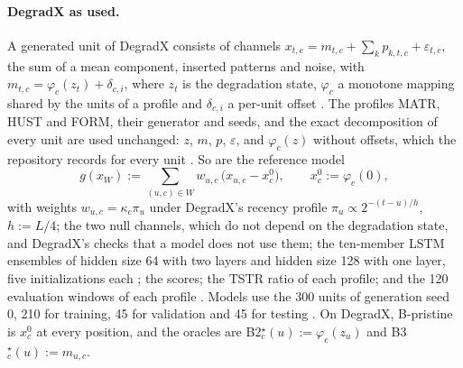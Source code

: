 \documentclass{article}
\begin{document}
\paragraph{DegradX as used.} A generated unit of DegradX consists of channels $x_{t,c} = m_{t,c}+\sum_k p_{k,t,c}+\varepsilon_{t,c}$, the sum of a mean component, inserted patterns and noise, with $m_{t,c}=\varphi_c(z_t)+\delta_{c,i}$, where $z_t$ is the degradation state, $\varphi_c$ a monotone mapping shared by the units of a profile and $\delta_{c,i}$ a per-unit offset \citep{degradx2026}. The profiles MATR, HUST and FORM, their generator and seeds, and the exact decomposition of every unit are used unchanged: $z$, $m$, $p$, $\varepsilon$, and $\varphi_c(z)$ without offsets, which the repository records for every unit \citep{degradxrepo}. So are the reference model
\begin{equation}\label{eq:refmodel}
g(x_W) := \sum_{(u,c)\in W} w_{u,c}\,\bigl(x_{u,c}-x^0_c\bigr), \qquad x^0_c := \varphi_c(0),
\end{equation}
with weights $w_{u,c}=\kappa_c\pi_u$ under DegradX's recency profile $\pi_u\propto 2^{-(t-u)/h}$, $h:=L/4$; the two null channels, which do not depend on the degradation state, and DegradX's checks that a model does not use them; the ten-member LSTM ensembles of hidden size 64 with two layers and hidden size 128 with one layer, five initializations each \citep{degradxrepo}; the scores; the TSTR ratio of each profile; and the 120 evaluation windows of each profile \citep{degradx2026}. Models use the 300 units of generation seed 0, 210 for training, 45 for validation and 45 for testing \citep{degradx2026}. On DegradX, B-pristine is $x^0_c$ at every position, and the oracles are B2$^\star_c(u) := \varphi_c(z_u)$ and B3$^\star_c(u) := m_{u,c}$.
\end{document}
